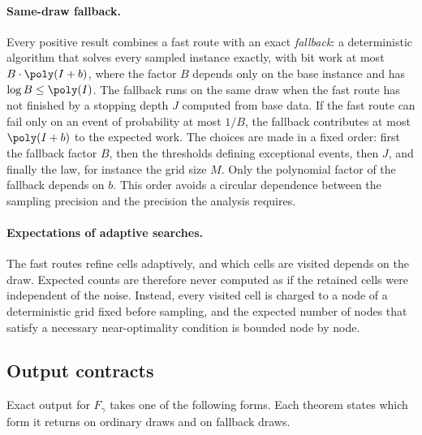\paragraph{Same-draw fallback.}
Every positive result combines a fast route with an exact
\emph{fallback}: a deterministic algorithm that solves every sampled
instance exactly, with bit work at most $B\cdot\poly(I+b)$, where the factor
$B$ depends only on the base instance and has $\log B\le\poly(I)$. The
fallback runs on the same draw when the fast route has not finished by a
stopping depth $J$ computed from base data. If the fast route can fail only
on an event of probability at most $1/B$, the fallback contributes at most
$\poly(I+b)$ to the expected work. The choices are made in a fixed order:
first the fallback factor $B$, then the thresholds defining exceptional
events, then $J$, and finally the law, for instance the grid size $M$. Only
the polynomial factor of the fallback depends on $b$. This order avoids a
circular dependence between the sampling precision and the precision the
analysis requires.

\paragraph{Expectations of adaptive searches.}
The fast routes refine cells adaptively, and which cells are visited
depends on the draw. Expected counts are therefore never computed as if the
retained cells were independent of the noise. Instead, every visited cell is
charged to a node of a deterministic grid fixed before sampling, and the
expected number of nodes that satisfy a necessary near-optimality condition
is bounded node by node.

\subsection{Output contracts}\label{sec:model:outputs}

Exact output for $F_\gamma$ takes one of the following forms. Each theorem
states which form it returns on ordinary draws and on fallback draws.

